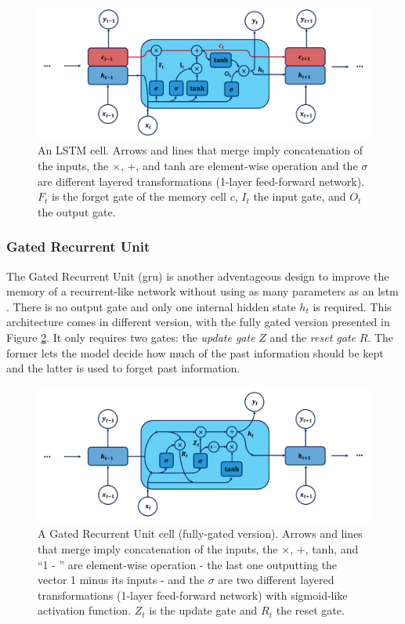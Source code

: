 \begin{figure}[h!]
    \center
    \includegraphics[scale=0.5]{Images/ML/lstm.png}
    \caption{An LSTM cell. Arrows and lines that merge imply concatenation of the inputs, the $\times$, $+$, and tanh are element-wise operation and the $\sigma$ are different layered transformations (1-layer feed-forward network). $F_t$ is the forget gate of the memory cell $c$, $I_t$ the input gate, and $O_t$ the output gate. } 
    \label{fig:lstmCell}
\end{figure}

\subsubsection{Gated Recurrent Unit} 
The Gated Recurrent Unit (\gls{gru}) is another adventageous design to improve the memory of a recurrent-like network without using as many parameters as an \gls{lstm} \cite{gruPaper}. There is no output gate and only one internal hidden state $h_t$ is required. This architecture comes in different version, with the fully gated version presented in Figure \ref{fig:gruCell}. It only requires two gates: the \textit{update gate} $Z$ and the \textit{reset gate} $R$. The former lets the model decide how much of the past information should be kept and the latter is used to forget past information.

\begin{figure}[h!]
    \center
    \includegraphics[scale=0.5]{Images/ML/gru.png}
    \caption{A Gated Recurrent Unit cell (fully-gated version). Arrows and lines that merge imply concatenation of the inputs, the $\times$, $+$, tanh, and ``1 - '' are element-wise operation - the last one outputting the vector 1 minus its inputs - and the $\sigma$ are two different layered transformations (1-layer feed-forward network) with sigmoid-like activation function. $Z_t$ is the update gate and $R_t$ the reset gate. } 
    \label{fig:gruCell}
\end{figure}

